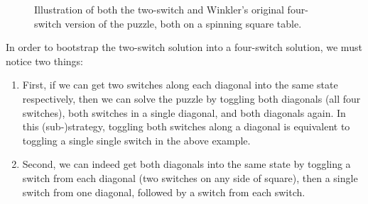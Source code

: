 \begin{figure}
  \center
  \caption[Illustration of a two-switch and original version of Winkler's ``Spinning Switches''.]{
    Illustration of both the two-switch and Winkler's original four-switch
    version of the puzzle, both on a spinning square table.
  }
  \label{fig:twoSwitches}
\end{figure}

In order to bootstrap the two-switch solution into a four-switch solution,
we must notice two things: \begin{enumerate}
  \item First, if we can get two switches along each diagonal into the same state
  respectively, then we can solve the puzzle by toggling both diagonals
  (all four switches), both switches in a single diagonal, and both diagonals
  again. In this (sub-)strategy, toggling both switches along a diagonal is
  equivalent to toggling a single single switch in the above example.
  \item Second, we can indeed get both diagonals into the same state by toggling a
  switch from each diagonal (two switches on any side of square),
  then a single switch from one diagonal,
  followed by a switch from each switch.
\end{enumerate}

